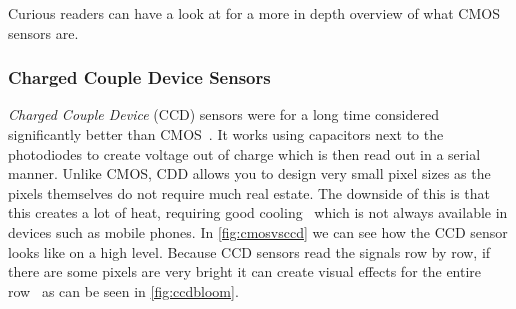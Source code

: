 Curious readers can have a look at \cite{CMOSReview, ieeeCMOS} for a more
in depth overview of what CMOS sensors are.

\subsubsection{Charged Couple Device Sensors}
\textit{Charged Couple Device} (CCD) sensors were for a long time considered
significantly better than CMOS~\cite{ieeeCMOS}. It works using capacitors next
to the photodiodes to create voltage out of charge which is then read out in a
serial manner. Unlike CMOS, CDD allows you to design very small pixel sizes as
the pixels themselves do not require much real estate. The downside of this is
that this creates a lot of heat, requiring good cooling~\cite{meng2016numerical}
which is not always available in devices such as mobile phones. In
\cref{fig:cmosvsccd} we can see how the CCD sensor looks like on a high level.
Because CCD sensors read the signals row by row, if there are some pixels are
very bright it can create visual effects for the entire row~\cite{ieeeCMOS} as
can be seen in \cref{fig:ccdbloom}.

\begin{figure}
    \centering
    \caption{}
\end{figure}

